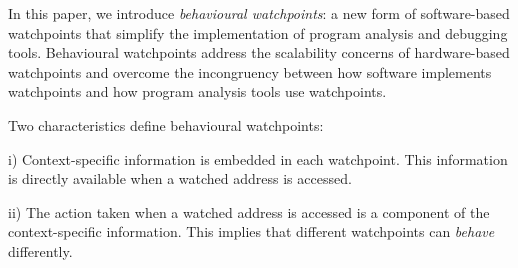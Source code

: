 \documentclass[letterpaper,twocolumn,10pt]{article}
\newenvironment{enumerate*}%
  {\begin{enumerate}%
    \setlength{\itemsep}{2pt}%
    \setlength{\parskip}{0pt}}%
  {\end{enumerate}}
\newcommand{\comment}[1]{}
\begin{document}



In this paper, we introduce \emph{behavioural watchpoints}: a new form of software-based watchpoints that simplify the implementation of program analysis and debugging tools.  Behavioural watchpoints address the scalability concerns of hardware-based watchpoints and overcome the incongruency between how software implements watchpoints and how program analysis tools use watchpoints.


Two characteristics define behavioural watchpoints:
\begin{enumerate*}
	\item[i)] Context-specific information is embedded in each watchpoint. This information is directly available when a watched address is accessed.
	\item[ii)] The action taken when a watched address is accessed is a component of the context-specific information. This implies that different watchpoints can \emph{behave} differently.
\end{enumerate*}




\end{document}
